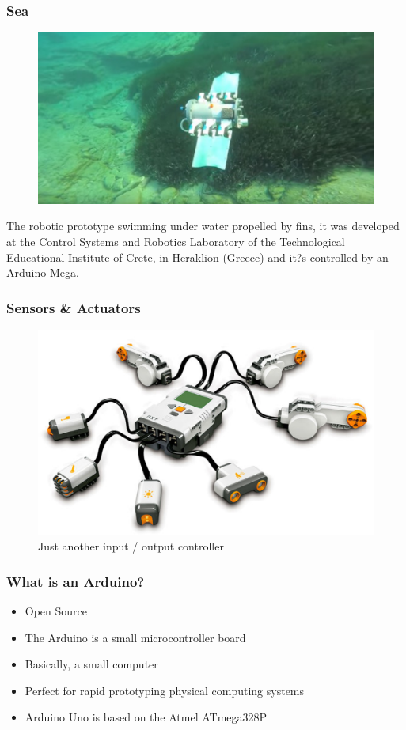 \begin{frame}
	\frametitle{Sea}
	\begin{figure}
		\includegraphics[scale=.4]{assets/sea}  
	\end{figure}
	The robotic prototype swimming under water propelled by fins, it was developed at the Control Systems and Robotics Laboratory of the Technological Educational Institute of Crete, in Heraklion (Greece) and it?s controlled by an Arduino Mega.
\end{frame}


\begin{frame}
	\frametitle{Sensors \& Actuators}
	\begin{figure}
		\includegraphics[scale=.15]{assets/nxt}  
		\caption{Just another input / output controller }
	\end{figure}
\end{frame}


\begin{frame}
  \frametitle{What is an Arduino?}
  \begin{itemize}
    \item Open Source
    \item The Arduino is a small microcontroller board
    \item Basically, a small computer 
    \item Perfect for rapid prototyping physical computing systems
    \item Arduino Uno is based on the Atmel ATmega328P
  \end{itemize}
\end{frame}



